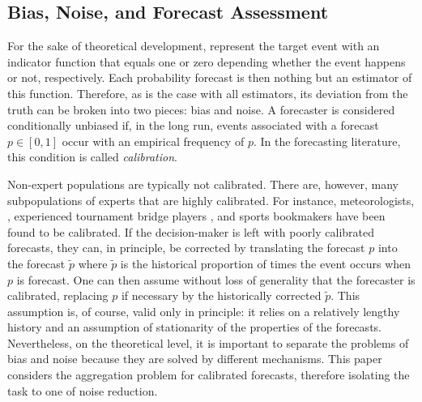 \documentclass[12pt]{article}
\theoremstyle{definition}
\theoremstyle{definition}
\def\pt{\tilde{p}}
\begin{document}
\subsection{Bias, Noise, and Forecast Assessment}
\label{BiasNoise}
For the sake of theoretical development,  represent the target event with an
indicator function that equals one or zero depending whether the event
happens or not, respectively. Each probability forecast is then nothing but an
estimator of this function. Therefore, as is the case with
all estimators, its deviation from the truth can be broken into two
pieces: bias and noise. A forecaster
is considered conditionally unbiased if, in the long run, events associated
with a forecast $p \in [0,1]$ occur with an empirical frequency of $p$. 
In the forecasting literature, this condition is called \textit{calibration}.


Non-expert populations are typically not calibrated. There are, however,  many subpopulations of experts that are highly
calibrated. For instance, meteorologists,
\citep{murphy1977reliability}, experienced tournament bridge
players 
\citep{keren1987facing}, and sports bookmakers
\citep{dowie1976efficiency} have been found to be calibrated. If the decision-maker is left with poorly
calibrated forecasts, they can, in principle, be corrected by
translating the forecast $p$ into the forecast $\pt$ where $\pt$ is
the historical proportion of times the event occurs when $p$ is
forecast.  One can then assume without loss of generality that the
forecaster is calibrated, replacing $p$ if necessary by the
historically corrected $\pt$. This assumption is, of course, valid
only in principle: it relies on a relatively lengthy history and an
assumption of stationarity of the properties of the forecasts.  
Nevertheless, on the
theoretical level, it is important to separate the problems of bias
and noise because they are solved by different mechanisms.  This
paper considers the aggregation problem for calibrated forecasts,
therefore isolating the task to one of noise reduction.
\end{document}
